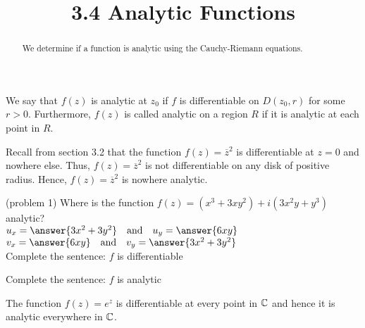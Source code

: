 \documentclass[handout]{ximera}
\title{3.4 Analytic Functions}
\begin{document}
\begin{abstract}
We determine if a function is analytic using the Cauchy-Riemann equations.
\end{abstract}

\maketitle

\begin{definition}
We say that $f(z)$ is analytic at $z_0$ if $f$ is differentiable on $D(z_0, r)$ for some $r>0$.
Furthermore, $f(z)$ is called analytic on a region $R$ if it is analytic at each point in $R$.
\end{definition}


\begin{example}[example 1]
Recall from section 3.2 that the function $f(z) = \overline{z}^2$ is differentiable 
at $z=0$ and nowhere else. Thus,
$f(z) = \overline{z}^2$ is not differentiable on any disk of positive radius. 
Hence, $f(z) = \overline{z}^2$ is nowhere analytic.
\end{example}

\begin{problem}(problem 1)
Where is the function $f(z) = (x^3 + 3xy^2) +i(3x^2y+y^3)$ analytic?\\
$u_x = \answer{3x^2+3y^2} \quad \text{and} \quad u_y = \answer{6xy}$\\
$v_x = \answer{6xy} \quad \text{and} \quad v_y = \answer{3x^2 + 3y^2}$\\
Complete the sentence:  $f$ is differentiable
\begin{multipleChoice}
\end{multipleChoice}
Complete the sentence:  $f$ is analytic
\begin{multipleChoice}
\end{multipleChoice}
\end{problem}


\begin{example}[example 2]
The function $f(z) = e^z$ is differentiable at every point in $\mathbb C$ and hence 
it is analytic everywhere in $\mathbb C$.
\end{example}
\end{document}

